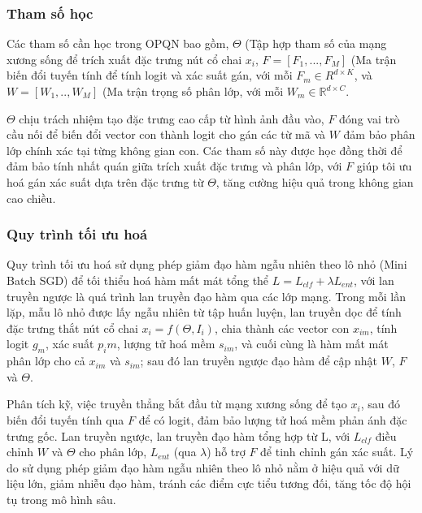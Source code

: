 
\subsubsection{Tham số học}
Các tham số cần học trong OPQN bao gồm, $\Theta$ (Tập hợp tham số của mạng xương sống để trích xuất đặc trưng nút cổ chai $x_i$, $F = [F_1,...,F_M]$ (Ma trận biến đổi tuyến tính để tính logit và xác suất gán, với mỗi $F_m \in R^{d \times K}$, và $W = [W_1,..,W_M]$ (Ma trận trọng số phân lớp, với mỗi $W_m \in \mathbb{R}^{d \times C}$.

$\Theta$ chịu trách nhiệm tạo đặc trưng cao cấp từ hình ảnh đầu vào, $F$ đóng vai trò cầu nối để biến đổi vector con thành logit cho gán các từ mã và $W$ đảm bảo phân lớp chính xác tại từng không gian con. Các tham số này được học đồng thời để đảm bảo tính nhất quán giữa trích xuất đặc trưng và phân lớp, với $F$ giúp tôi ưu hoá gán xác suất dựa trên đặc trưng từ $\Theta$, tăng cường hiệu quả trong không gian cao chiều. 

\subsubsection{ Quy trình tối ưu hoá}
Quy trình tối ưu hoá sử dụng phép giảm đạo hàm ngẫu nhiên theo lô nhỏ (Mini Batch SGD) để tối thiểu hoá hàm mất mát tổng thể $ L = L_{clf} + \lambda L_{ent} $, với lan truyền ngược là quá trình lan truyền đạo hàm qua các lớp mạng. Trong mỗi lần lặp, mẫu lô nhỏ được lấy ngẫu nhiên từ tập huấn luyện, lan truyền dọc để tính đặc trưng thắt nút cổ chai $x_i = f(\Theta, I_i)$, chia thành các vector con $x_{im}$, tính logit $g_m$, xác suất $p_im$, lượng tử hoá mềm $s_{im}$, và cuối cùng là hàm mất mát phân lớp cho cả $x_{im}$ và $s_{im}$; sau đó lan truyền ngược đạo hàm để cập nhật $W$, $F$ và $\Theta$.

Phân tích kỹ, việc truyền thẳng bắt đầu từ mạng xương sống để tạo $x_i$, sau đó biến đổi tuyến tính qua $F$ để có logit, đảm bảo lượng tử hoá mềm phản ánh đặc trưng gốc. Lan truyền ngược, lan truyền đạo hàm tổng hợp từ L, với $L_{clf}$ điều chỉnh $W$ và $\Theta$ cho phân lớp, $L_{ent}$ (qua $\lambda$) hỗ trợ $F$ để tinh chỉnh gán xác suất. Lý do sử dụng phép giảm đạo hàm ngẫu nhiên theo lô nhỏ nằm ở hiệu quả với dữ liệu lớn, giảm nhiễu đạo hàm, tránh các điểm cực tiểu tương đối, tăng tốc độ hội tụ trong mô hình sâu.

